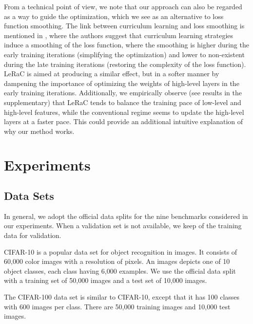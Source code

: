 \documentclass[10pt,twocolumn,letterpaper]{article}
\begin{document}
From a technical point of view, we note that our approach can also be regarded as a way to guide the optimization, which we see as an alternative to loss function smoothing. The link between curriculum learning and loss smoothing is mentioned in \cite{Soviany-IJCV-2022}, where the authors suggest that curriculum learning strategies induce a smoothing of the loss function, where the smoothing is higher during the early training iterations (simplifying the optimization) and lower to non-existent during the late training iterations (restoring the complexity of the loss function). LeRaC is aimed at producing a similar effect, but in a softer manner by dampening the importance of optimizing the weights of high-level layers in the early training iterations. Additionally, we empirically observe (see results in the supplementary) that LeRaC tends to balance the training pace of low-level and high-level features, while the conventional regime seems to update the high-level layers at a faster pace. This could provide an additional intuitive explanation of why our method works.



\vspace{-0.1cm}
\section{Experiments}
\label{sec_experiments}
\vspace{-0.1cm}
\subsection{Data Sets}
\vspace{-0.1cm}

In general, we adopt the official data splits for the nine benchmarks considered in our experiments. When a validation set is not available, we keep  of the training data for validation.

CIFAR-10 \cite{Krizhevsky-TECHREP-2009} is a popular data set for object recognition in images. It consists of 60,000 color images with a resolution of  pixels. An images depicts one of 10 object classes, each class having 6,000 examples. We use the official data split with a training set of 50,000 images and a test set of 10,000 images. 

The CIFAR-100 \cite{Krizhevsky-TECHREP-2009} data set is similar to CIFAR-10, except that it has 100 classes with 600 images per class. There are 50,000 training images and 10,000 test images.
\end{document}
